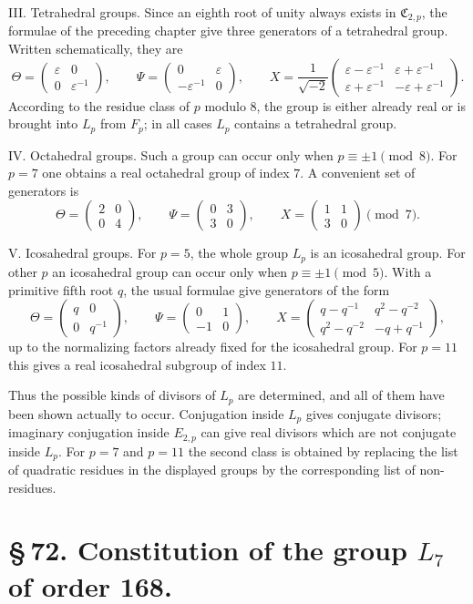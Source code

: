 \documentclass[11pt]{article}
\providecommand{\mat}[4]{\begin{pmatrix}#1&#2\\#3&#4\end{pmatrix}}
\providecommand{\mat}[4]{\begin{pmatrix}#1&#2\\#3&#4\end{pmatrix}}
\providecommand{\Cfield}{\mathfrak C}
\begin{document}
III. Tetrahedral groups. Since an eighth root of unity always exists in $\Cfield_{2,p}$, the formulae of the preceding chapter give three generators of a tetrahedral group. Written schematically, they are
\begin{equation}
 \Theta=\mat{\varepsilon}{0}{0}{\varepsilon^{-1}},
 \qquad
 \Psi=\mat{0}{\varepsilon}{-\varepsilon^{-1}}{0},
 \qquad
 X=\frac{1}{\sqrt{-2}}\mat{\varepsilon-\varepsilon^{-1}}{\varepsilon+\varepsilon^{-1}}{\varepsilon+\varepsilon^{-1}}{-\varepsilon+\varepsilon^{-1}}.
 \tag{6}
\end{equation}
According to the residue class of $p$ modulo $8$, the group is either already real or is brought into $L_p$ from $F_p$; in all cases $L_p$ contains a tetrahedral group.

IV. Octahedral groups. Such a group can occur only when $p\equiv\pm1\pmod8$. For $p=7$ one obtains a real octahedral group of index $7$. A convenient set of generators is
\begin{equation}
 \Theta=\mat{2}{0}{0}{4},
 \qquad
 \Psi=\mat{0}{3}{3}{0},
 \qquad
 X=\mat{1}{1}{3}{0}\pmod7.
 \tag{7}
\end{equation}

V. Icosahedral groups. For $p=5$, the whole group $L_p$ is an icosahedral group. For other $p$ an icosahedral group can occur only when $p\equiv\pm1\pmod5$. With a primitive fifth root $q$, the usual formulae give generators of the form
\begin{equation}
 \Theta=\mat{q}{0}{0}{q^{-1}},
 \qquad
 \Psi=\mat{0}{1}{-1}{0},
 \qquad
 X=\mat{q-q^{-1}}{q^2-q^{-2}}{q^2-q^{-2}}{-q+q^{-1}},
 \tag{8}
\end{equation}
up to the normalizing factors already fixed for the icosahedral group. For $p=11$ this gives a real icosahedral subgroup of index $11$.

Thus the possible kinds of divisors of $L_p$ are determined, and all of them have been shown actually to occur. Conjugation inside $L_p$ gives conjugate divisors; imaginary conjugation inside $E_{2,p}$ can give real divisors which are not conjugate inside $L_p$. For $p=7$ and $p=11$ the second class is obtained by replacing the list of quadratic residues in the displayed groups by the corresponding list of non-residues.

\section*{\S\,72. Constitution of the group $L_7$ of order 168.}
\end{document}
